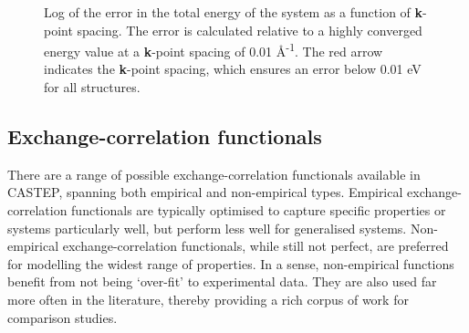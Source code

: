 \begin{figure}[ht]
\begin{center}
		\caption{Log of the error in the total energy of the system as a function of \textbf{k}-point spacing. The error is calculated relative to a highly converged energy value at a \textbf{k}-point spacing of 0.01 \r{A}\textsuperscript{-1}. The red arrow indicates the \textbf{k}-point spacing, which ensures an error below 0.01 eV for all structures.}
		\label{Figure:kpoint_convergence}
	\end{center}
\end{figure}

\subsection{Exchange-correlation functionals}

There are a range of possible exchange-correlation functionals available in CASTEP, spanning both empirical and non-empirical types. Empirical exchange-correlation functionals are typically optimised to capture specific properties or systems particularly well, but perform less well for generalised systems. Non-empirical exchange-correlation functionals, while still not perfect, are preferred for modelling the widest range of properties. In a sense, non-empirical functions benefit from not being `over-fit' to experimental data. They are also used far more often in the literature, thereby providing a rich corpus of work for comparison studies.

